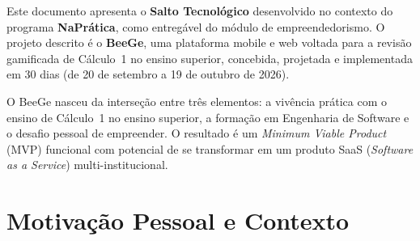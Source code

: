 \documentclass[12pt, a4paper]{article}
\begin{document}
Este documento apresenta o \textbf{Salto Tecnol\'{o}gico} desenvolvido no contexto do programa \textbf{NaPr\'{a}tica}, como entreg\'{a}vel do m\'{o}dulo de empreendedorismo. O projeto descrito \'{e} o \textbf{BeeGe}, uma plataforma mobile e web voltada para a revis\~{a}o gamificada de C\'{a}lculo~1 no ensino superior, concebida, projetada e implementada em 30 dias (de 20 de setembro a 19 de outubro de 2026).

O BeeGe nasceu da interse\c{c}\~{a}o entre tr\^{e}s elementos: a viv\^{e}ncia pr\'{a}tica com o ensino de C\'{a}lculo~1 no ensino superior, a forma\c{c}\~{a}o em Engenharia de Software e o desafio pessoal de empreender. O resultado \'{e} um \textit{Minimum Viable Product} (MVP) funcional com potencial de se transformar em um produto SaaS (\textit{Software as a Service}) multi-institucional.

\section{Motiva\c{c}\~{a}o Pessoal e Contexto}
\end{document}
